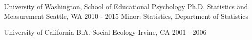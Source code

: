 

\begin{cventries}

  \cventry
  {University of Washington, School of Educational Psychology}
  {Ph.D. Statistics and Measurement}
  {Seattle, WA}
  {2010 - 2015}
  {Minor: Statistics, Department of Statistics}
  {}

  \cventry
  {University of California}
  {B.A. Social Ecology}
  {Irvine, CA}
  {2001 - 2006} {} {}
\end{cventries}
